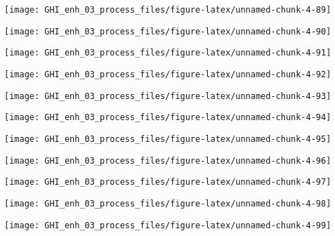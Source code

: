 \documentclass[
  10pt,
  a4paper,oneside]{article}
\begin{document}
\begin{center}\texttt{[image: GHI\_enh\_03\_process\_files/figure-latex/unnamed-chunk-4-89]} \end{center}

\begin{center}\texttt{[image: GHI\_enh\_03\_process\_files/figure-latex/unnamed-chunk-4-90]} \end{center}

\begin{center}\texttt{[image: GHI\_enh\_03\_process\_files/figure-latex/unnamed-chunk-4-91]} \end{center}

\begin{center}\texttt{[image: GHI\_enh\_03\_process\_files/figure-latex/unnamed-chunk-4-92]} \end{center}

\begin{center}\texttt{[image: GHI\_enh\_03\_process\_files/figure-latex/unnamed-chunk-4-93]} \end{center}

\begin{center}\texttt{[image: GHI\_enh\_03\_process\_files/figure-latex/unnamed-chunk-4-94]} \end{center}

\begin{center}\texttt{[image: GHI\_enh\_03\_process\_files/figure-latex/unnamed-chunk-4-95]} \end{center}

\begin{center}\texttt{[image: GHI\_enh\_03\_process\_files/figure-latex/unnamed-chunk-4-96]} \end{center}

\begin{center}\texttt{[image: GHI\_enh\_03\_process\_files/figure-latex/unnamed-chunk-4-97]} \end{center}

\begin{center}\texttt{[image: GHI\_enh\_03\_process\_files/figure-latex/unnamed-chunk-4-98]} \end{center}

\begin{center}\texttt{[image: GHI\_enh\_03\_process\_files/figure-latex/unnamed-chunk-4-99]} \end{center}
\end{document}
